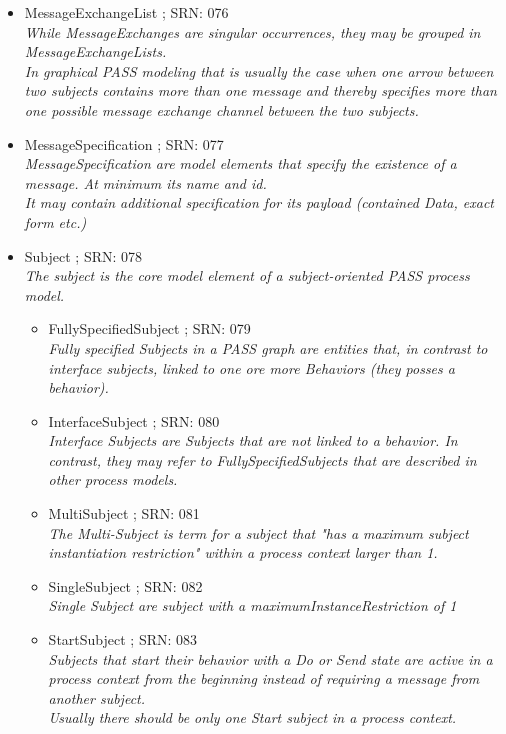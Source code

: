 \begin{itemize}
\begin{itemize}
\begin{itemize}
{					While message exchanges are singular occurrences, they may be grouped in MessageExchangeLists}
				\item MessageExchangeList ; SRN: 076 \\ \textit{While MessageExchanges are singular occurrences, they may be grouped in MessageExchangeLists.\\
					In graphical PASS modeling that is usually the case when one arrow between two subjects contains more than one message and thereby specifies more than one possible message exchange channel between the two subjects.}
				\item MessageSpecification ; SRN: 077 \\ \textit{MessageSpecification are model elements that specify the existence of a message. At minimum its name and id.\\It may contain additional specification for its payload (contained Data, exact form etc.)}
				\item Subject ; SRN: 078 \\ \textit{The subject is the core model element of a subject-oriented PASS process model.}
				\begin{itemize}
					\item FullySpecifiedSubject ; SRN: 079 \\ \textit{Fully specified Subjects in a PASS graph are entities that, in contrast to interface subjects, linked to one ore more Behaviors (they posses a behavior).}
					\item InterfaceSubject ; SRN: 080 \\ \textit{Interface Subjects are Subjects that are not linked to a behavior. In contrast, they may refer to FullySpecifiedSubjects that are described in other process models.}
					\item MultiSubject ; SRN: 081 \\ \textit{The Multi-Subject is term for a subject that "has a maximum subject instantiation restriction" within a process context larger than 1.}
					\item SingleSubject ; SRN: 082 \\ \textit{Single Subject are subject with a maximumInstanceRestriction of 1}
					\item StartSubject ; SRN: 083 \\ \textit{Subjects that start their behavior with a Do or Send state are active in a process context from the beginning instead of requiring a message from another subject.\\
						Usually there should be only one Start subject in a process context.}
				\end{itemize}
			\end{itemize}
			

\end{itemize}
\end{itemize}
